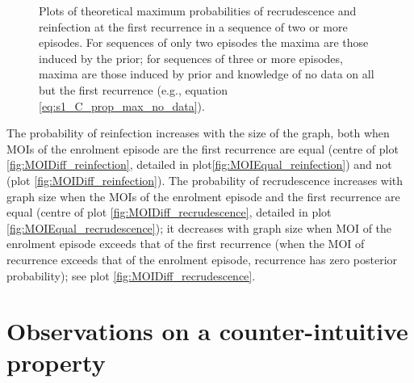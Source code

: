 \documentclass{article}
\begin{document}
\begin{figure}[h]
\caption{Plots of theoretical maximum probabilities of recrudescence and reinfection at the first recurrence in a sequence of two or more episodes. For sequences of only two episodes the maxima are those induced by the prior; for sequences of three or more episodes, maxima are those induced by prior and knowledge of no data on all but the first recurrence (e.g., equation \eqref{eq:s1_C_prop_max_no_data}).}
\label{fig:fig}
\end{figure}

The probability of reinfection increases with the size of the graph, both when MOIs of the enrolment episode are the first recurrence are equal (centre of plot \ref{fig:MOIDiff_reinfection}, detailed in plot\ref{fig:MOIEqual_reinfection}) and not (plot \ref{fig:MOIDiff_reinfection}). The probability of recrudescence increases with graph size when the MOIs of the enrolment episode and the first recurrence are equal (centre of plot \ref{fig:MOIDiff_recrudescence}, detailed in plot \ref{fig:MOIEqual_recrudescence}); it decreases with graph size when MOI of the enrolment episode exceeds that of the first recurrence (when the MOI of recurrence exceeds that of the enrolment episode, recurrence has zero posterior probability); see plot \ref{fig:MOIDiff_recrudescence}. 

\section*{Observations on a counter-intuitive property}
\end{document}
